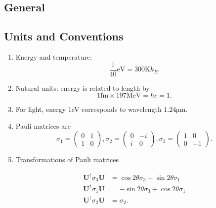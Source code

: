 \documentclass{sciposter}
\begin{document}
\begin{multicols}{3}


\section{General}


\subsection{Units and Conventions}

\begin{enumerate}
\item Energy and temperature: \begin{equation}
\frac{1}{40}\mathrm{eV} = 300\mathrm{K} k_B .
\end{equation}
\item Natural units: energy is related to length by
\begin{equation}
1\mathrm{fm}\times 197\mathrm{MeV}=\hbar c = 1.
\end{equation}
\item For light, energy 1eV corresponds to wavelength $1.24\mathrm{\mu m}$.
\item Pauli matrices are
\begin{equation}
    \sigma_1 = \begin{pmatrix} 0 & 1 \\ 1 & 0 \end{pmatrix}, \sigma_2 = \begin{pmatrix} 0 & -i \\ i & 0 \end{pmatrix},\sigma_3 = \begin{pmatrix} 1 & 0 \\ 0 & -1 \end{pmatrix}.
\end{equation}
\item Transformations of Pauli matrices

\begin{align}
\mathbf{U}^\dagger \sigma_3 \mathbf{U} &= \cos 2\theta \sigma_3 - \sin 2\theta \sigma_1 \\
\mathbf{U}^\dagger \sigma_1 \mathbf{U} &= -\sin 2\theta \sigma_3 + \cos 2\theta \sigma_1 \\
\mathbf{U}^\dagger \sigma_2 \mathbf{U} &= \sigma_2.
\end{align}

\end{enumerate}





\end{multicols}
\end{document}
